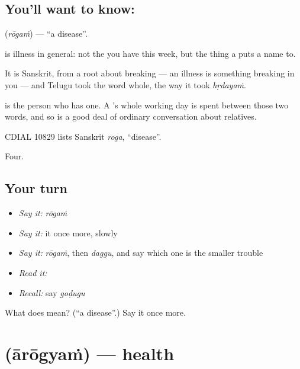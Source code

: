 \subsection*{You'll want to know: }
\textbf{} (\emph{rōgaṁ}) — \textquotedblleft{}a disease\textquotedblright{}.

 is illness in general: not the  you have this week, but the thing a  puts a name to.

It is Sanskrit, from a root about breaking — an illness is something breaking in you — and Telugu took the word whole, the way it took \emph{hṛdayaṁ}.

 is the person who has one. A 's whole working day is spent between those two words, and so is a good deal of ordinary conversation about relatives.

CDIAL 10829 lists Sanskrit \emph{roga}, \textquotedblleft{}disease\textquotedblright{}.

\begin{grammarlens}[title={What you've built}]
Four.
\end{grammarlens}

\subsection*{Your turn}
\begin{itemize}
\raggedright
  \item \emph{Say it:} \emph{rōgaṁ}
  \item \emph{Say it:} it once more, slowly
  \item \emph{Say it:} \emph{rōgaṁ}, then \emph{daggu}, and say which one is the smaller trouble
  \item \emph{Read it:} \textbf{}
  \item \emph{Recall:} say \emph{goḍugu}
\end{itemize}

\begin{tcolorbox}[breakable,colback=teal!4,colframe=teal!35!black,title={Before you move on}]
What does  mean? (\textquotedblleft{}a disease\textquotedblright{}.) Say it once more.
\end{tcolorbox}
\section[\texorpdfstring{\te{ఆరోగ్యం} (ārōgyaṁ)}{ఆరోగ్యం (ārōgyaṁ)}]{ (ārōgyaṁ) — health}


